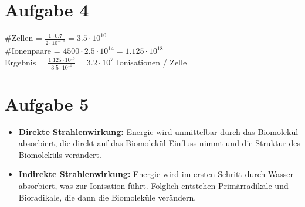 \section{Aufgabe 4}
\#Zellen = $\frac{1 \cdot 0.7}{2 \cdot 10^{-11}} = 3.5 \cdot 10^{10}$ \\
\#Ionenpaare = $4500 \cdot 2.5 \cdot 10^{14} = 1.125 \cdot 10^{18}$ \\
Ergebnis = $\frac{1.125 \cdot 10^{18}}{3.5 \cdot 10^{10}} = 3.2 \cdot 10 ^7$ Ionisationen / Zelle 

\section{Aufgabe 5}
\begin{itemize}
    \item \textbf{Direkte Strahlenwirkung:} Energie wird unmittelbar durch das Biomolekül absorbiert, die direkt auf das Biomolekül Einfluss nimmt und die Struktur des Biomoleküls verändert.   
    \item \textbf{Indirekte Strahlenwirkung:} Energie wird im ersten Schritt durch Wasser absorbiert, was zur Ionisation führt. Folglich entstehen Primärradikale und Bioradikale, die dann die Biomoleküle verändern.
\end{itemize}